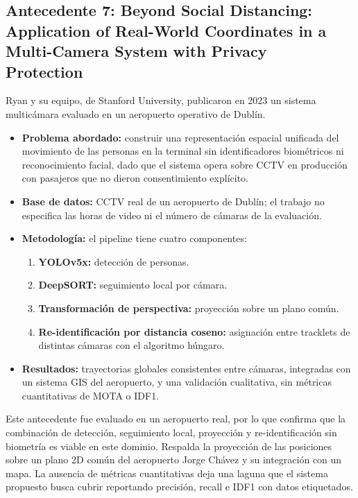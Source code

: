 \documentclass[12pt,letterpaper]{article}
\begin{document}
\subsection{Antecedente 7: Beyond Social Distancing: Application of Real-World Coordinates in a Multi-Camera System with Privacy Protection~\cite{ryan2023}}

Ryan y su equipo, de Stanford University, publicaron en 2023 un sistema
multicámara evaluado en un aeropuerto operativo de Dublín.

\begin{itemize}
    \item \textbf{Problema abordado:} construir una representación
    espacial unificada del movimiento de las personas en la terminal sin
    identificadores biométricos ni reconocimiento facial, dado que el
    sistema opera sobre CCTV en producción con pasajeros que no dieron
    consentimiento explícito.

    \item \textbf{Base de datos:} CCTV real de un aeropuerto de Dublín;
    el trabajo no especifica las horas de video ni el número de cámaras
    de la evaluación.

    \item \textbf{Metodología:} el pipeline tiene cuatro componentes:
    \begin{enumerate}
        \item \textbf{YOLOv5x:} detección de personas.
        \item \textbf{DeepSORT:} seguimiento local por cámara.
        \item \textbf{Transformación de perspectiva:} proyección sobre un
        plano común.
        \item \textbf{Re-identificación por distancia coseno:} asignación
        entre tracklets de distintas cámaras con el algoritmo húngaro.
    \end{enumerate}

    \item \textbf{Resultados:} trayectorias globales consistentes entre
    cámaras, integradas con un sistema GIS del aeropuerto, y una
    validación cualitativa, sin métricas cuantitativas de MOTA o IDF1.
\end{itemize}

Este antecedente fue evaluado en un aeropuerto real, por lo que confirma
que la combinación de detección, seguimiento local, proyección y
re-identificación sin biometría es viable en este dominio. Respalda la
proyección de las posiciones sobre un plano 2D común del aeropuerto Jorge
Chávez y su integración con un mapa. La ausencia de métricas
cuantitativas deja una laguna que el sistema propuesto busca cubrir
reportando precisión, recall e IDF1 con datos etiquetados.
\end{document}

